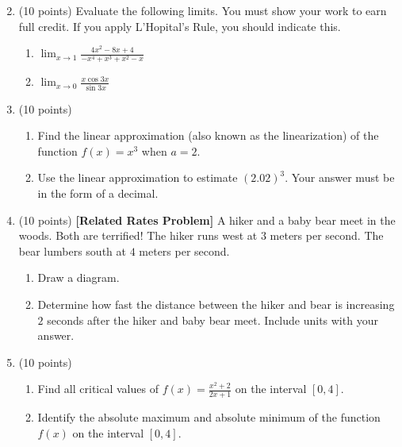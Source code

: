 \documentclass[12pt]{article}
\begin{document}
\begin{enumerate}
\begin{multicols}{2}
\begin{enumerate}
	

	\end{enumerate}
	\end{multicols}


\pagebreak

\item (10 points) Evaluate the following limits. You must show your work to earn full credit. If you apply L'Hopital's Rule, you should indicate this.
	\begin{enumerate}
	\item $\displaystyle{\lim_{x\to 1} \frac{4x^2-8x+4}{-x^4+x^3+x^2-x}}$
	\vspace{1.5in}
	\item $\displaystyle{\lim_{x\to 0} \frac{x\cos 3x}{\sin 3x}}$
	\vspace{1.5in}
	\end{enumerate}
	
\item (10 points) 
	\begin{enumerate}
	\item Find the linear approximation (also known as the linearization) of the function $f(x)=x^3$ when $a=2.$
	\vfill
	\item Use the linear approximation to estimate $(2.02)^3$. Your answer must be in the form of a decimal.
	\vfill
	\end{enumerate}
\newpage

\item (10 points) \textbf{[Related Rates Problem]} A hiker and a baby bear meet in the woods. Both are terrified! The hiker runs west at $3$ meters per second. The bear lumbers south at $4$ meters per second.
	\begin{enumerate}
	\item Draw a diagram.
	\vspace{2in}
	\item Determine how fast the distance between the hiker and bear is 	increasing  $2$ seconds after the hiker and baby bear meet. Include units with your answer.
	\vspace{2in}
	\end{enumerate}
\newpage
\item (10 points) 
	\begin{enumerate}
	\item Find all critical values of $\displaystyle{f(x)=\frac{x^2+2}{2x+1}}$ on the interval $[0,4]$.
	\vfill
	\item Identify the absolute maximum and absolute minimum of the function $f(x)$ on the interval $[0,4].$
	\vfill


\end{enumerate}
\end{enumerate}
\end{document}

